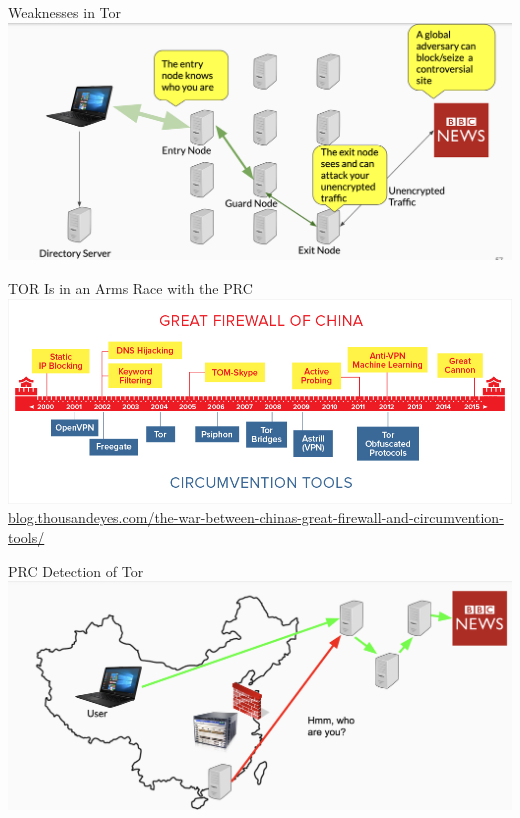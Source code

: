 \documentclass[nobackground,dvipsnames,table,aspectratio=169]{beamer}
\begin{document}
\begin{frame}{Weaknesses in Tor}
    \includegraphics[width=\textwidth]{tor-weaknesses}
\end{frame}

\begin{frame}{TOR Is in an Arms Race with the PRC}
    \includegraphics[width=\textwidth]{china-firewall-race}
    \tiny{\href{https://blog.thousandeyes.com/the-war-between-chinas-great-firewall-and-circumvention-tools/}{blog.thousandeyes.com/the-war-between-chinas-great-firewall-and-circumvention-tools/}}
\end{frame}

\begin{frame}{PRC Detection of Tor}
    \includegraphics[width=\textwidth]{prc-tor-detection}
\end{frame}
\end{document}
